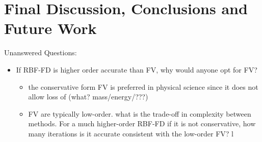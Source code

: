 \chapter{Final Discussion, Conclusions and Future Work}
\label{chap:conclusions}


Unanswered Questions: 
\begin{itemize} 
\item If RBF-FD is higher order accurate than FV, why would anyone opt for FV?
\begin{itemize} 
\item the conservative form FV is preferred in physical science since it does not allow loss of (what? mass/energy/???)
\item FV are typically low-order. what is the trade-off in complexity between methods. For a much higher-order RBF-FD if it is not conservative, how many iterations is it accurate consistent with the low-order FV? l
\end{itemize}
\end{itemize}
